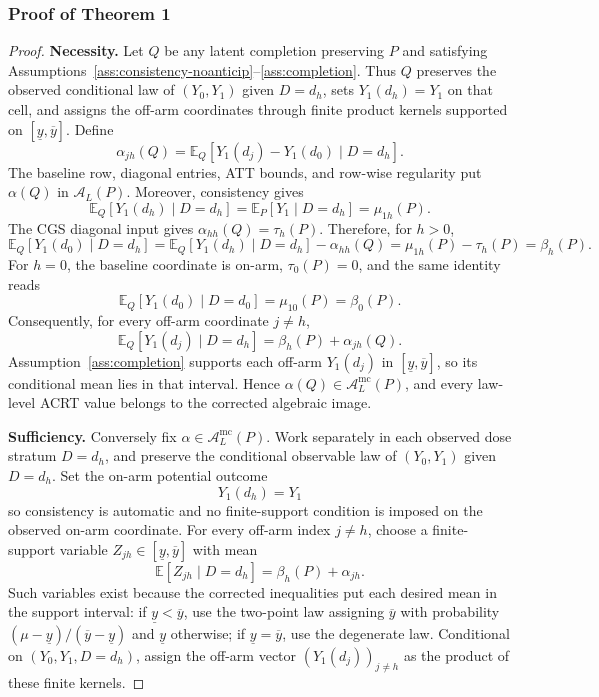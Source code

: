 \documentclass[11pt]{article}
\newcommand{\E}{\mathbb{E}}
\theoremstyle{definition}
\theoremstyle{plain}
\theoremstyle{remark}
\begin{document}
\subsubsection*{Proof of Theorem 1}
\begin{proof}
\textbf{Necessity.} Let \(Q\) be any latent completion preserving \(P\) and
satisfying Assumptions~\ref{ass:consistency-noanticip}--\ref{ass:completion}.
Thus \(Q\) preserves the observed conditional law of \((Y_0,Y_1)\) given
\(D=d_h\), sets \(Y_1(d_h)=Y_1\) on that cell, and assigns the off-arm
coordinates through finite product kernels supported on
\([\underline y,\overline y]\).  Define
\[
  \alpha_{j h}(Q)
  =
  \E_Q[Y_1(d_j)-Y_1(d_0)\mid D=d_h].
\]
The baseline row, diagonal entries, ATT bounds, and row-wise regularity put
\(\alpha(Q)\) in \(\mathcal A_L(P)\).  Moreover, consistency gives
\[
  \E_Q[Y_1(d_h)\mid D=d_h]
  =
  \E_P[Y_1\mid D=d_h]
  =
  \mu_{1h}(P).
\]
The CGS diagonal input gives \(\alpha_{hh}(Q)=\tau_h(P)\).  Therefore, for
\(h>0\),
\[
  \E_Q[Y_1(d_0)\mid D=d_h]
  =
  \E_Q[Y_1(d_h)\mid D=d_h]-\alpha_{hh}(Q)
  =
  \mu_{1h}(P)-\tau_h(P)
  =
  \beta_h(P).
\]
For \(h=0\), the baseline coordinate is on-arm, \(\tau_0(P)=0\), and the same
identity reads
\[
  \E_Q[Y_1(d_0)\mid D=d_0]=\mu_{10}(P)=\beta_0(P).
\]
Consequently, for every off-arm coordinate \(j\ne h\),
\[
  \E_Q[Y_1(d_j)\mid D=d_h]
  =
  \beta_h(P)+\alpha_{j h}(Q).
\]
Assumption~\ref{ass:completion} supports each off-arm \(Y_1(d_j)\) in
\([\underline y,\overline y]\), so its conditional mean lies in that interval.
Hence \(\alpha(Q)\in\mathcal A_L^{\mathrm{mc}}(P)\), and every law-level ACRT
value belongs to the corrected algebraic image.

\textbf{Sufficiency.} Conversely fix
\(\alpha\in\mathcal A_L^{\mathrm{mc}}(P)\).  Work separately in each observed
dose stratum \(D=d_h\), and preserve the conditional observable law of
\((Y_0,Y_1)\) given \(D=d_h\).  Set the on-arm potential outcome
\[
  Y_1(d_h)=Y_1
\]
so consistency is automatic and no finite-support condition is imposed on the
observed on-arm coordinate.  For every off-arm index \(j\ne h\), choose a
finite-support variable \(Z_{jh}\in[\underline y,\overline y]\) with mean
\[
  \E[Z_{jh}\mid D=d_h]=\beta_h(P)+\alpha_{jh}.
\]
Such variables exist because the corrected inequalities put each desired mean
in the support interval: if \(\underline y<\overline y\), use the two-point
law assigning \(\overline y\) with probability
\((\mu-\underline y)/(\overline y-\underline y)\) and \(\underline y\)
otherwise; if \(\underline y=\overline y\), use the degenerate law.  Conditional
on \((Y_0,Y_1,D=d_h)\), assign the off-arm vector
\((Y_1(d_j))_{j\ne h}\) as the product of these finite kernels.


\end{proof}
\end{document}
